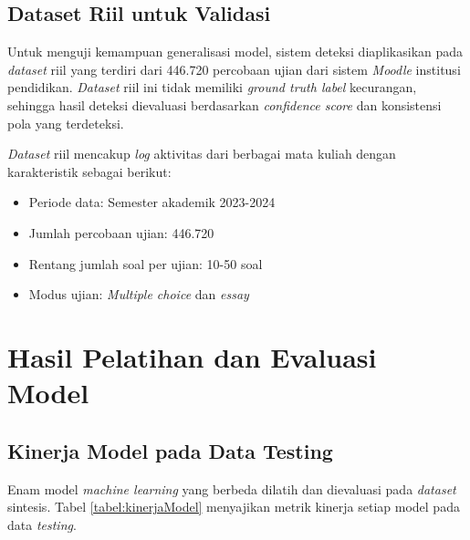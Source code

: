 \subsection{Dataset Riil untuk Validasi}
\label{subsec:datasetRiil}

Untuk menguji kemampuan generalisasi model, sistem deteksi diaplikasikan pada \textit{dataset} riil yang terdiri dari 446.720 percobaan ujian dari sistem \textit{Moodle} institusi pendidikan. \textit{Dataset} riil ini tidak memiliki \textit{ground truth label} kecurangan, sehingga hasil deteksi dievaluasi berdasarkan \textit{confidence score} dan konsistensi pola yang terdeteksi.

\textit{Dataset} riil mencakup \textit{log} aktivitas dari berbagai mata kuliah dengan karakteristik sebagai berikut:
\begin{itemize}
    \item Periode data: Semester akademik 2023-2024
    \item Jumlah percobaan ujian: 446.720
    \item Rentang jumlah soal per ujian: 10-50 soal
    \item Modus ujian: \textit{Multiple choice} dan \textit{essay}
\end{itemize}

\section{Hasil Pelatihan dan Evaluasi Model}
\label{sec:hasilPelatihanEvaluasi}

\subsection{Kinerja Model pada Data Testing}
\label{subsec:kinerjaModelTesting}

Enam model \textit{machine learning} yang berbeda dilatih dan dievaluasi pada \textit{dataset} sintesis. Tabel \ref{tabel:kinerjaModel} menyajikan metrik kinerja setiap model pada data \textit{testing}.

